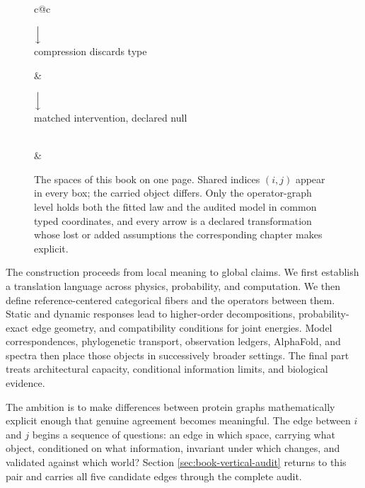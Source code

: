 \begin{figure}[htbp]
\begin{tabular}{c@{\hspace{9mm}}c}
\\[7pt]
\begin{minipage}{0.36\linewidth}\centering
$\Big\downarrow$\\[1pt]{\scriptsize compression discards type}
\end{minipage} &
\begin{minipage}{0.36\linewidth}\centering
$\Big\downarrow$\\[1pt]{\scriptsize matched intervention, declared null}
\end{minipage}\\[7pt]
 &
\end{tabular}
\caption{The spaces of this book on one page.  Shared indices $(i,j)$ appear in every box; the
carried object differs.  Only the operator-graph level holds both the fitted law and the audited
model in common typed coordinates, and every arrow is a declared transformation whose lost or
added assumptions the corresponding chapter makes explicit.}
\label{fig:book-space-map}
\end{figure}

The construction proceeds from local meaning to global claims.  We first establish a translation
language across physics, probability, and computation.  We then define reference-centered
categorical fibers and the operators between them.  Static and dynamic responses lead to
higher-order decompositions, probability-exact edge geometry, and compatibility conditions for
joint energies.  Model correspondences, phylogenetic transport, observation ledgers, AlphaFold,
and spectra then place those objects in successively broader settings.  The final part treats
architectural capacity, conditional information limits, and biological evidence.

The ambition is to make differences between protein graphs mathematically explicit enough that
genuine agreement becomes meaningful.  The edge between $i$ and $j$ begins a sequence of
questions: an edge in which space, carrying what object, conditioned on what information, invariant
under which changes, and validated against which world?  Section
\ref{sec:book-vertical-audit} returns to this pair and carries all five candidate edges through the
complete audit.
